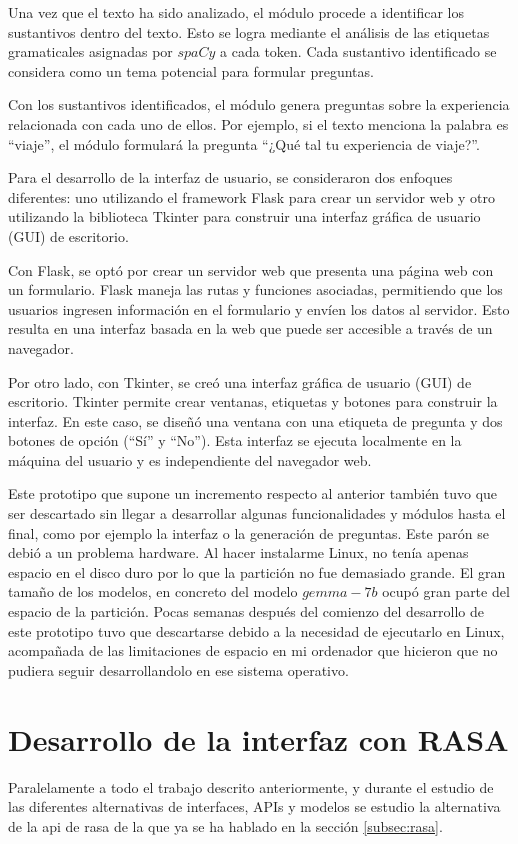 Una vez que el texto ha sido analizado, el módulo procede a identificar los sustantivos dentro del texto. Esto se logra mediante el análisis de las etiquetas gramaticales asignadas por $spaCy$ a cada token. Cada sustantivo identificado se considera como un tema potencial para formular preguntas.

Con los sustantivos identificados, el módulo genera preguntas sobre la experiencia relacionada con cada uno de ellos. Por ejemplo, si el texto menciona la palabra es ``viaje'', el módulo formulará la pregunta ``¿Qué tal tu experiencia de viaje?''.

Para el desarrollo de la interfaz de usuario, se consideraron dos enfoques diferentes: uno utilizando el framework Flask para crear un servidor web y otro utilizando la biblioteca Tkinter para construir una interfaz gráfica de usuario (GUI) de escritorio.

Con Flask, se optó por crear un servidor web que presenta una página web con un formulario. Flask maneja las rutas y funciones asociadas, permitiendo que los usuarios ingresen información en el formulario y envíen los datos al servidor. Esto resulta en una interfaz basada en la web que puede ser accesible a través de un navegador.

Por otro lado, con Tkinter, se creó una interfaz gráfica de usuario (GUI) de escritorio. Tkinter permite crear ventanas, etiquetas y botones para construir la interfaz. En este caso, se diseñó una ventana con una etiqueta de pregunta y dos botones de opción (``Sí'' y ``No''). Esta interfaz se ejecuta localmente en la máquina del usuario y es independiente del navegador web.

Este prototipo que supone un incremento respecto al anterior también tuvo que ser descartado sin llegar a desarrollar algunas funcionalidades y módulos hasta el final, como por ejemplo la interfaz o la generación de preguntas. Este parón se debió a un problema hardware. Al hacer instalarme Linux, no tenía apenas espacio en el disco duro por lo que la partición no fue demasiado grande. El gran tamaño de los modelos, en concreto del modelo $gemma-7b$ ocupó gran parte del espacio de la partición. Pocas semanas después del comienzo del desarrollo de este prototipo tuvo que descartarse debido a la necesidad de ejecutarlo en Linux, acompañada de las limitaciones de espacio en mi ordenador que hicieron que no pudiera seguir desarrollandolo en ese sistema operativo. 

\section{Desarrollo de la interfaz con RASA}
Paralelamente a todo el trabajo descrito anteriormente, y durante el estudio de las diferentes alternativas de interfaces, APIs y modelos se estudio la alternativa de la api de rasa de la que ya se ha hablado en la sección \ref{subsec:rasa}. 

